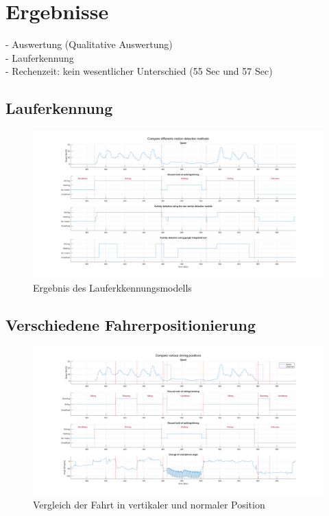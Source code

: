 \chapter{Ergebnisse}


- Auswertung (Qualitative Auswertung)\\
- Lauferkennung \\
- Rechenzeit: kein wesentlicher Unterschied (55 Sec und 57 Sec)


\section{Lauferkennung}

\begin{figure}[H]
	\centering
	\includegraphics[width=\linewidth]{Bilder/Speed_Groundtruth_MotionClass_GoogleMD_Compare.png}
	\caption{Ergebnis des Lauferkkennungsmodells}
	\label{fig:Speed_Groundtruth_MotionClass_GoogleMD_Compare}
\end{figure}



\section{Verschiedene Fahrerpositionierung}

\begin{figure}[H]
	\centering
	\includegraphics[width=\linewidth]{Bilder/Speed_Groundtruth_WalkStand_Compare.png}
	\caption{Vergleich der Fahrt in vertikaler und normaler Position}
	\label{fig:Speed_Groundtruth_WalkStand_Compare}
\end{figure}

